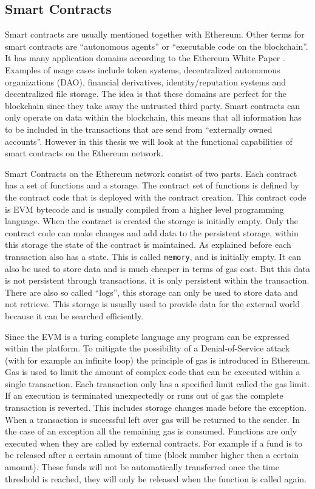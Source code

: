 \documentclass[a4paper]{article}
\begin{document}
\subsection{Smart Contracts}
Smart contracts are usually mentioned together with Ethereum. Other terms for smart contracts are ``autonomous agents'' or ``executable code on the blockchain''. It has many application domains according to the Ethereum White Paper \cite{buterin2013ethereum}. Examples of usage cases include token systems, decentralized autonomous organizations (DAO), financial derivatives, identity/reputation systems and decentralized file storage. The idea is that these domains are perfect for the blockchain since they take away the untrusted third party. Smart contracts can only operate on data within the blockchain, this means that all information has to be included in the transactions that are send from ``externally owned accounts''. However in this thesis we will look at the functional capabilities of smart contracts on the Ethereum network. \par 
Smart Contracts on the Ethereum network consist of two parts. Each contract has a set of functions and a storage. The contract set of functions is defined by the contract code that is deployed with the contract creation. This contract code is EVM bytecode and is usually compiled from a higher level programming language. When the contract is created the storage is initially empty. Only the contract code can make changes and add data to the persistent storage, within this storage the state of the contract is maintained. As explained before each transaction also has a state. This is called \texttt{memory}, and is initially empty. It can also be used to store data and is much cheaper in terms of gas cost. But this data is not persistent through transactions, it is only persistent within the transaction. There are also so called ``logs'', this storage can only be used to store data and not retrieve. This storage is usually used to provide data for the external world because it can be searched efficiently.\par
Since the EVM is a turing complete language any program can be expressed within the platform. To mitigate the possibility of a Denial-of-Service attack (with for example an infinite loop) the principle of gas is introduced in Ethereum. Gas is used to limit the amount of complex code that can be executed within a single transaction. Each transaction only has a specified limit called the gas limit. If an execution is terminated unexpectedly or runs out of gas the complete transaction is reverted. This includes storage changes made before the exception. When a transaction is successful left over gas will be returned to the sender. In the case of an exception all the remaining gas is consumed.
Functions are only executed when they are called by external contracts. For example if a fund is to be released after a certain amount of time (block number higher then a certain amount). These funds will not be automatically transferred once the time threshold is reached, they will only be released when the function is called again.\par
\end{document}
